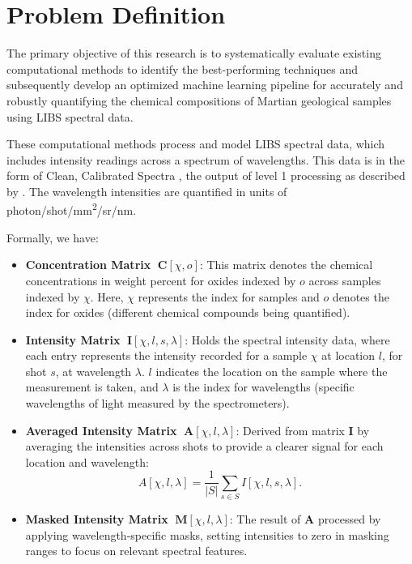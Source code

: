 \section{Problem Definition}\label{sec:problem_definition}
The primary objective of this research is to systematically evaluate existing computational methods to identify the best-performing techniques and subsequently develop an optimized machine learning pipeline for accurately and robustly quantifying the chemical compositions of Martian geological samples using LIBS spectral data.

These computational methods process and model LIBS spectral data, which includes intensity readings across a spectrum of wavelengths. This data is in the form of Clean, Calibrated Spectra \cite{andersonImprovedAccuracyQuantitative2017}, the output of level 1 processing as described by \citet{wiensPreflightCalibrationInitial2013}. The wavelength intensities are quantified in units of photon/shot/mm\textsuperscript{2}/sr/nm.

Formally, we have:
\begin{itemize}[topsep=0pt]
    \item \textbf{Concentration Matrix} $\;\mathbf{C}[\chi, o]$: This matrix denotes the chemical concentrations in weight percent for oxides indexed by $o$ across samples indexed by $\chi$. Here, $\chi$ represents the index for samples and $o$ denotes the index for oxides (different chemical compounds being quantified).
    \label{matrix:concentration}

    \item \textbf{Intensity Matrix} $\;\mathbf{I}[\chi, l, s, \lambda]$: Holds the spectral intensity data, where each entry represents the intensity recorded for a sample $\chi$ at location $l$, for shot $s$, at wavelength $\lambda$. $l$ indicates the location on the sample where the measurement is taken, and $\lambda$ is the index for wavelengths (specific wavelengths of light measured by the spectrometers).
    \label{matrix:intensity}

    \item \textbf{Averaged Intensity Matrix} $\;\mathbf{A}[\chi, l, \lambda]$: Derived from matrix $\mathbf{I}$ by averaging the intensities across shots to provide a clearer signal for each location and wavelength:
    \[
    A[\chi, l, \lambda] = \frac{1}{|S|} \sum_{s \in S} I[\chi, l, s, \lambda].
    \]
    \label{matrix:averaged_intensity}

    \item \textbf{Masked Intensity Matrix} $\;\mathbf{M}[\chi, l, \lambda]$: The result of $\mathbf{A}$ processed by applying wavelength-specific masks, setting intensities to zero in masking ranges to focus on relevant spectral features.
    \label{matrix:masked_intensity}
\end{itemize}

